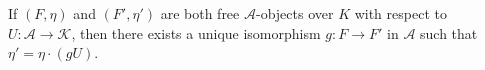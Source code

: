 If $(F, \eta)$ and $(F', \eta')$ are both free $\mathcal{A}$-objects over $K$ with respect to $U: \mathcal{A} \longrightarrow \mathcal{K}$, then there exists a unique isomorphism $g: F \longrightarrow F'$ in $\mathcal{A}$ such that $\eta' = \eta \cdot (gU)$.
